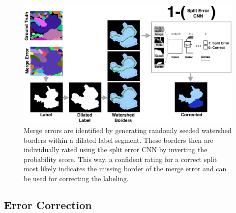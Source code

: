 \begin{figure}[h]
\begin{center}
  \includegraphics[width=\linewidth]{gfx/merge_error.png}
\end{center}
  \vspace{-4mm}
   \caption{Merge errors are identified by generating randomly seeded watershed borders within a dilated label segment. These borders then are individually rated using the split error CNN by inverting the probability score. This way, a confident rating for a correct split most likely indicates the missing border of the merge error and can be used for correcting the labeling.}
\label{fig:merge_error}
\end{figure}

\subsection{Error Correction}

